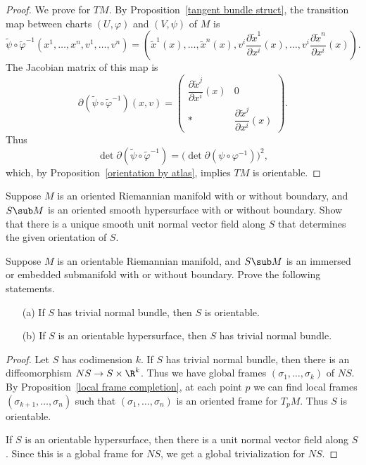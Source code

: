 \begin{proof}
We prove for $TM$. By Proposition~\ref{tangent bundle struct}, the transition map between charts $(U,\varphi)$ and $(V,\psi)$ of $M$ is
\[\widetilde{\psi}\circ\widetilde{\varphi}^{-1}(x^1,\dots,x^n,v^1,\dots,v^n)=(\widetilde{x}^1(x),\dots,\widetilde{x}^n(x),v^i\frac{\partial\widetilde{x}^1}{\partial x^i}(x),\dots,v^i\frac{\partial\widetilde{x}^n}{\partial x^i}(x)).\]
The Jacobian matrix of this map is
\[\partial(\widetilde{\psi}\circ\widetilde{\varphi}^{-1})(x,v)=\begin{pmatrix}
\dfrac{\partial\widetilde{x}^j}{\partial x^i}(x)&0\\[8pt]
*&\dfrac{\partial\widetilde{x}^j}{\partial x^i}(x)
\end{pmatrix}.\]
Thus \[\det\partial(\widetilde{\psi}\circ\widetilde{\varphi}^{-1})=\big(\det\partial(\psi\circ\varphi^{-1})\big)^2,\]
which, by Proposition~\ref{orientation by atlas}, implies $TM$ is orientable.
\end{proof}
\begin{exercise}
Suppose $M$ is an oriented Riemannian manifold with or without boundary, and $S\sub M$ is an oriented smooth hypersurface with or without boundary. Show that there is a unique smooth unit normal vector field along $S$ that determines the given orientation of $S$.
\end{exercise}
\begin{exercise}
Suppose $M$ is an orientable Riemannian manifold, and $S\sub M$ is an immersed or embedded submanifold with or without boundary. Prove the following statements.
\begin{itemize}
\item[(a)] If $S$ has trivial normal bundle, then $S$ is orientable.
\item[(b)] If $S$ is an orientable hypersurface, then $S$ has trivial normal bundle.
\end{itemize}
\end{exercise}
\begin{proof}
Let $S$ has codimension $k$. If $S$ has trivial normal bundle, then there is an diffeomorphism $NS\to S\times\R^k$. Thus we have global frames $(\sigma_1,\dots,\sigma_k)$ of $NS$. By Proposition~\ref{local frame completion}, at each point $p$ we can find local frames $(\sigma_{k+1},\dots,\sigma_{n})$ such that $(\sigma_1,\dots,\sigma_n)$ is an oriented frame for $T_pM$. Thus $S$ is orientable.\par
If $S$ is an orientable hypersurface, then there is a unit normal vector field along $S$. Since this is a global frame for $NS$, we get a global trivialization for $NS$.
\end{proof}

